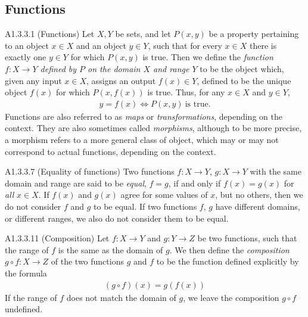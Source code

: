 \subsection{Functions}
\begin{definition}{A1.3.3.1}
    (Functions) Let $X, Y$ be sets, and let $P(x, y)$ be a property pertaining to an object $x\in X$ and an object
    $y\in Y$, such that for every $x\in X$ there is exactly one $y\in Y$ for which $P(x, y)$ is true.
    Then we define the \emph{function $f: X\rightarrow Y$ defined by $P$ on the domain $X$ and range $Y$} to be the
    object which, given any input $x\in X$, assigns an output $f(x)\in Y$, defined to be the unique object $f(x)$ for
    which $P(x, f(x))$ is true. Thus, for any $x\in X$ and $y\in Y$,
    \begin{align*}
        y=f(x) \iff P(x, y)~\text{is true}.
    \end{align*}
    Functions are also referred to as \emph{maps} or \emph{transformations}, depending on the context. They are also
    sometimes called \emph{morphisms}, although to be more precise, a morphism refers to a more general class of object,
    which may or may not correspond to actual functions, depending on the context.
\end{definition}

\begin{definition}{A1.3.3.7}
    (Equality of functions) Two functions $f: X\rightarrow Y$, $g: X\rightarrow Y$ with the same domain and range are
    said to be \emph{equal}, $f=g$, if and only if $f(x)=g(x)$ for \emph{all} $x\in X$. If $f(x)$ and $g(x)$ agree for
    some values of $x$, but no others, then we do not consider $f$ and $g$ to be equal. If two functions $f$, $g$ have
    different domains, or different ranges, we also do not consider them to be equal.
\end{definition}

\begin{definition}{A1.3.3.11}
    (Composition) Let $f: X\rightarrow Y$ and $g: Y\rightarrow Z$ be two functions, such that the range of $f$ is the
    same as the domain of $g$. We then define the \emph{composition} $g\circ f: X\rightarrow Z$ of the two functions
    $g$ and $f$ to be the function defined explicitly by the formula
    \begin{align*}
        (g\circ f)(x) = g(f(x))
    \end{align*}
    If the range of $f$ does not match the domain of $g$, we leave the composition $g\circ f$ undefined.
\end{definition}

